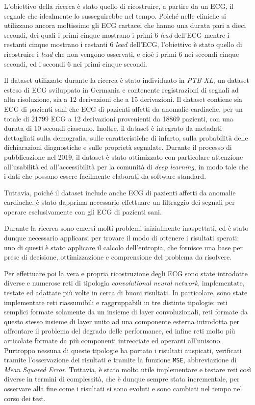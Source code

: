 \documentclass[12pt,italian]{report}
\begin{document}
	L'obiettivo della ricerca è stato quello di ricostruire, a partire da un ECG, il segnale che idealmente lo susseguirebbe nel tempo. Poiché nelle cliniche si utilizzano ancora moltissimo gli ECG cartacei che hanno una durata pari a dieci secondi, dei quali i primi cinque mostrano i primi 6 \textit{lead} dell'ECG mentre i restanti cinque mostrano i restanti 6 \textit{lead} dell'ECG, l'obiettivo è stato quello di ricostruire i \textit{lead} che non vengono osservati, e cioè i primi 6 nei secondi cinque secondi, ed i secondi 6 nei primi cinque secondi.
	
	Il dataset utilizzato durante la ricerca è stato individuato in \textit{PTB-XL}, un dataset esteso di ECG sviluppato in Germania e contenente registrazioni di segnali ad alta risoluzione, sia a 12 derivazioni che a 15 derivazioni. Il dataset contiene sia ECG di pazienti sani che ECG di pazienti affetti da anomalie cardiache, per un totale di 21799 ECG a 12 derivazioni provenienti da 18869 pazienti, con una durata di 10 secondi ciascuno. Inoltre, il dataset è integrato da metadati dettagliati sulla demografia, sulle caratteristiche di infarto, sulla probabilità delle dichiarazioni diagnostiche e sulle proprietà segnalate. Durante il processo di pubblicazione nel 2019, il dataset è stato ottimizzato con particolare attenzione all'usabilità ed all'accessibilità per la comunità di \textit{deep learning}, in modo tale che i dati che possano essere facilmente elaborati da software standard.
	
	Tuttavia, poiché il dataset include anche ECG di pazienti affetti da anomalie cardiache, è stato dapprima necessario effettuare un filtraggio dei segnali per operare esclusivamente con gli ECG di pazienti sani.
	
	Durante la ricerca sono emersi molti problemi inizialmente inaspettati, ed è stato dunque necessario applicarsi per trovare il modo di ottenere i risultati sperati: uno di questi è stato applicare il calcolo dell'entropia, che fornisce una base per prese di decisione, ottimizzazione e comprensione del problema da risolvere.
	
	Per effettuare poi la vera e propria ricostruzione degli ECG sono state introdotte diverse e numerose reti di tipologia \textit{convolutional neural network}, implementate, testate ed adattate più volte in cerca di buoni risultati. In particolare, sono state implementate reti riassumibili e raggruppabili in tre distinte tipologie: reti semplici formate solamente da un insieme di layer convoluzionali, reti formate da questo stesso insieme di layer unito ad una componente esterna introdotta per affrontare il problema del degrado delle performance, ed infine reti molto più articolate formate da più componenti intrecciate ed operanti all'unisono. Purtroppo nessuna di queste tipologie ha portato i risultati auspicati, verificati tramite l'osservazione dei risultati e tramite la funzione \texttt{MSE}, abbreviazione di \textit{Mean Squared Error}. Tuttavia, è stato molto utile implementare e testare reti così diverse in termini di complessità, che è dunque sempre stata incrementale, per osservare alla fine come i risultati si sono evoluti e sono cambiati nel tempo nel corso dei test.
	
\end{document}
